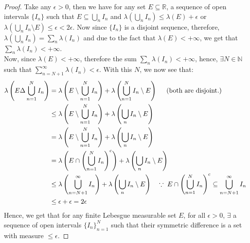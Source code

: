\documentclass{article}
\theoremstyle{definition}
\theoremstyle{remark}
\theoremstyle{definition}
\theoremstyle{definition}
\theoremstyle{definition}
\newcommand{\union}{\cup}
\newcommand{\intrs}{\cap}
\newcommand{\bunion}{\bigcup}
\newcommand{\bintrs}{\bigcap}
\newcommand{\R}{\mathbb{R}}
\newcommand{\N}{\mathbb{N}}
\newcommand{\comp}[1]{#1^{\text{c}}}
\newcommand{\lm}[1]{\lambda\left (#1\right )}
\begin{document}
\begin{proof}
	Take any $ \epsilon > 0 $, then we have for any set $ E \subseteq\R $, a sequence of open intervals $ \{I_n\} $ such that $ E\subseteq \bunion_n I_n $ and $ \lm{\bunion_n I_n} \le \lm{E} + \epsilon $ or $ \lm{\bunion_n I_n \setminus E} \le \epsilon <2\epsilon$. Now since $ \{I_n\} $ is a disjoint sequence, therefore, $ \lm{\bunion_n I_n} = \sum_n \lm{I_n} $ and due to the fact that $ \lm{E} < + \infty $, we get that $ \sum_n  \lm{I_n} < + \infty$.\\
Now, since $ \lm{E} < + \infty $, therefore the sum $ \sum_{n} \lm{I_n} <+\infty$, hence, $ \exists N \in \N $ such that $ \sum_{n=N+1}^{\infty}\lm{I_n} < \epsilon $. With this $ N $, we now see that:
\begin{equation*}
	\begin{split}
		\lm{E\Delta \bunion_{n=1}^{N} I_n} &= \lm{E\setminus \bunion_{n=1}^{N} I_n} + \lm{\bunion_{n=1}^{N}I_n \setminus E} \;\;\;\;\;\text{(both are disjoint.)}\\
		&\le \lm{E\setminus \bunion_{n=1}^{N} I_n} + \lm{\bunion_{n}I_n \setminus E}\\
		&= \lm{E\setminus \bunion_{n=1}^{N} I_n} + \lm{\bunion_{n}I_n \setminus E}\\
		&= \lm{E\intrs \left (\bunion_{n=1}^{N} I_n\right )^{\text{c}}} +  \lm{\bunion_{n}I_n \setminus E}\\
		&\le \lm{\bunion_{n=N+1}^{\infty} I_n} +\lm{\bunion_{n}I_n \setminus E}\;\;\;\;\text{$ \because \; E\intrs \left (\bunion_{n=1}^{N} I_n\right )^{\text{c}}\subseteq \bunion_{n=N+1}^{\infty} I_n$ }\\
		&\le \epsilon + \epsilon = 2\epsilon
	\end{split}
\end{equation*}
Hence, we get that for any finite Lebesgue measurable set $ E $, for all $ \epsilon > 0 $, $ \exists  $ a sequence of open intervals $ \{I_n\}_{n=1}^{N} $ such that their symmetric difference is a set with measure $ \le \epsilon $.
\end{proof}
\end{document}
